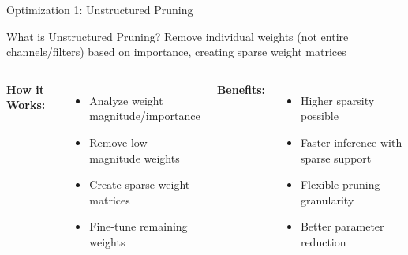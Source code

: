 \documentclass[aspectratio=169,xcolor=dvipsnames]{beamer}
\begin{document}
\begin{frame}{Optimization 1: Unstructured Pruning}
    \begin{block}{What is Unstructured Pruning?}
        Remove individual weights (not entire channels/filters) based on importance, creating sparse weight matrices
    \end{block}
    
    \begin{columns}
        \textbf{How it Works:}
        \begin{itemize}
            \item Analyze weight magnitude/importance
            \item Remove low-magnitude weights
            \item Create sparse weight matrices
            \item Fine-tune remaining weights
        \end{itemize}
        
        \textbf{Benefits:}
        \begin{itemize}
            \item Higher sparsity possible
            \item Faster inference with sparse support
            \item Flexible pruning granularity
            \item Better parameter reduction
        \end{itemize}
    \end{columns}
    
    \vspace{0.3cm}
    


\end{frame}
\end{document}
